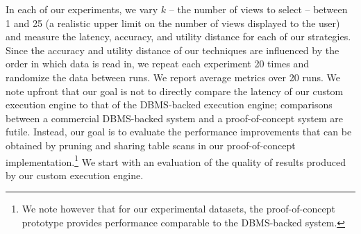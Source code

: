 


In each of our experiments, we vary $k$ -- the number of views to select -- between
1 and 25 (a realistic upper limit on the number of views displayed to the user)
and measure the latency, accuracy, and utility distance for each of our
strategies. 
Since the accuracy and utility distance of our techniques are influenced by the
order in which data is read in, we repeat each experiment 20
times and randomize the data between runs. We report average
metrics over 20 runs.
We note upfront that our goal is not to directly compare the latency of our custom
execution engine to that of the DBMS-backed execution
engine; comparisons between a commercial DBMS-backed system and a proof-of-concept
system are futile.
Instead, our goal is to evaluate the performance improvements that can be
obtained by pruning and sharing table scans in our proof-of-concept 
implementation.\footnote{We note however that for our experimental datasets, 
the proof-of-concept prototype provides performance comparable to the DBMS-backed
system.} We start with an evaluation of the quality of results produced by our custom execution
engine.








